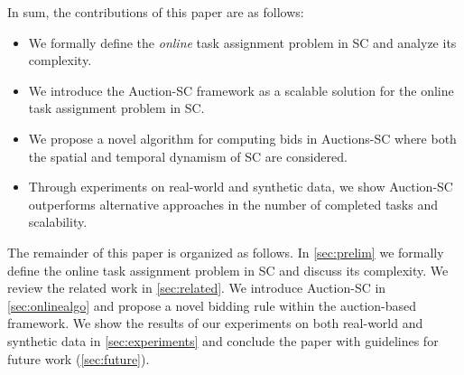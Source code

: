 In sum, the contributions of this paper are as follows:

\begin{itemize}
\item We formally define the \textit{online} task assignment problem in SC and analyze its complexity.
\item We introduce the Auction-SC framework as a scalable solution for the online task assignment problem in SC. 
\item We propose a novel algorithm for computing bids in Auctions-SC where both the spatial and temporal dynamism of SC are considered.
\item Through experiments on real-world and synthetic data, we show Auction-SC outperforms alternative approaches in the number of completed tasks and scalability.
\end{itemize}

The remainder of this paper is organized as follows. In \cref{sec:prelim} we formally define the online task assignment problem in SC and discuss its complexity. We review the related work in \cref{sec:related}. We introduce Auction-SC in \cref{sec:onlinealgo} and propose a novel bidding rule within the auction-based framework. We show the results of our experiments on both real-world and synthetic data in \cref{sec:experiments} and conclude the paper with guidelines for future work (\cref{sec:future}).